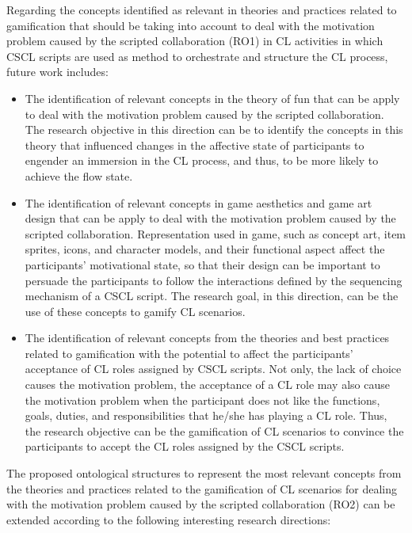 Regarding the concepts identified as relevant in theories and practices related to gamification that should be taking into account to deal with the motivation problem caused by the scripted collaboration (RO1) in CL activities in which CSCL scripts are used as method to orchestrate and structure the CL process, future work includes:

\begin{itemize}
\item The identification of relevant concepts in the theory of fun \cite{Koster2004, Lazzaro2009} that can be apply to deal with the motivation problem caused by the scripted collaboration. The research objective in this direction can be to identify the concepts in this theory that influenced changes in the affective state of participants to engender an immersion in the CL process, and thus, to be more likely to achieve the flow state.

\item The identification of relevant concepts in game aesthetics and game art design \cite{NamKimKimLee2016, Dickey2012} that can be apply to deal with the motivation problem caused by the scripted collaboration. Representation used in game, such as concept art, item sprites, icons, and character models, and their functional aspect affect the participants' motivational state, so that their design can be important to persuade the participants to follow the interactions defined by the sequencing mechanism of a CSCL script. The research goal, in this direction, can be the use of these concepts to gamify CL scenarios.

\item The identification of relevant concepts from the theories and best practices related to gamification with the potential to affect the participants' acceptance of CL roles assigned by CSCL scripts. Not only, the lack of choice causes the motivation problem, the acceptance of a CL role may also cause the motivation problem when the participant does not like the functions, goals, duties, and responsibilities that he/she has playing a CL role. Thus, the research objective can be the gamification of CL scenarios to convince the participants to accept the CL roles assigned by the CSCL scripts. 
\end{itemize}

The proposed ontological structures to represent the most relevant concepts from the theories and practices related to the gamification of CL scenarios for dealing with the motivation problem caused by the scripted collaboration (RO2) can be extended according to the following interesting research directions:

